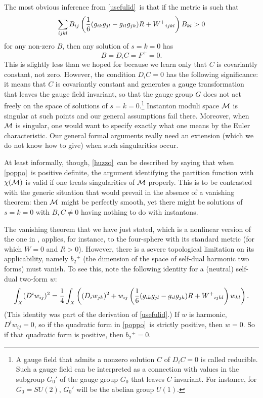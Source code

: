 \documentclass[12pt]{article}
\numberwithin{equation}{section}
\begin{document}
The most obvious inference from
\eqref{usefulid}\ is that if
the metric is such that
\begin{equation}
  \label{poppo}
  \sum_{ijkl} B_{ij}\left({1\over
  6}(g_{ik}g_{jl}-g_{il}g_{jk})R+W^+{}_{ijkl} \right)B_{kl}>0
\end{equation}
for any non-zero $B$,
then any solution of $s=k=0$ has
\begin{equation}
  \label{huzzo}
  B=D_iC=F^+=0.
\end{equation}
This is slightly less than we hoped for because we learn only that
$C$ is covariantly constant, not zero.  However, the condition $D_iC=0$
has the following significance: it means that $C$ is covariantly constant
and generates a gauge transformation that leaves the gauge field invariant,
so that the gauge group $G$ does not act freely on the space of solutions
of $s=k=0$.\footnote{A gauge field that admits a nonzero solution $C$
  of $D_iC=0$ is called reducible.  Such a gauge field can be
  interpreted as a connection with values in the subgroup $G_0'$ of the
  gauge group $G_0$ that leaves $C$ invariant.  For instance, for
$G_0=SU(2)$, $G_0'$ will be the abelian group $U(1)$.}
Instanton moduli space ${\cal M}$ is singular at such points
and our general assumptions fail there.
Moreover, when ${\cal M}$ is singular, one would want to specify
exactly what one means by the Euler characteristic.
Our general formal arguments really need an extension
(which we do not know how to give) when such singularities occur.

At least informally, though, \eqref{huzzo}\ can be described by saying that
when \eqref{poppo}\ is positive definite, the argument identifying the partition
function with $\chi({\cal M})$ is valid if one treats singularities of
${\cal M}$
properly. This is to be contrasted with the generic situation
that would prevail in the absence of a vanishing theorem: then ${\cal M}$ might
be perfectly smooth, yet there might be solutions of $s=k=0$
with $B,C\not= 0$ having nothing to do with instantons.

The vanishing theorem that we have just stated, which is a nonlinear
version of the one in \cite{ahs}, applies, for instance,
to the four-sphere with its standard metric (for which $W=0$ and $R>0$).
However, there is a severe topological
limitation on its applicability,
namely $b_2{}^+$ (the dimension of the space of self-dual harmonic
two forms) must vanish.  To see this, note the following identity
for a (neutral) self-dual two-form $w$:
\begin{equation}
  \label{nuseful}
  \int_X(D^iw_{ij})^2={1\over 4}\int_X\left((D_iw_{jk})^2+
    w_{ij}\left({1\over 6}(g_{ik}g_{jl}-g_{il}g_{jk})R+W^+{}_{ijkl}
  \right)w_{kl}\right).
\end{equation}
(This identity was part of the derivation of
\eqref{usefulid}.)
If $w$ is harmonic, $D^iw_{ij}=0$, so if the quadratic form in \eqref{poppo}\
is strictly positive, then $w=0$.  So if that quadratic form is
positive, then $b_2{}^+=0$.
\end{document}
